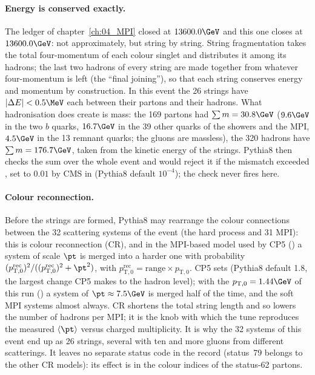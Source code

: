 \paragraph{Energy is conserved exactly.}
The ledger of chapter~\ref{ch:04_MPI} closed at $13600.0\GeV$ and this one closes at $13600.0\GeV$: not
approximately, but string by string. String fragmentation takes the total four-momentum of each colour
singlet and distributes it among its hadrons; the last two hadrons of every string are made together from
whatever four-momentum is left (the ``final joining''), so that each string conserves energy and momentum
by construction. In this event the 26 strings have $|\Delta E|<0.5\MeV$ each between their partons and
their hadrons. What hadronisation does create is mass: the 169 partons had $\sum m=30.8\GeV$ ($9.6\GeV$ in the
two $b$ quarks, $16.7\GeV$ in the 39 other quarks of the showers and the MPI, $4.5\GeV$ in the 13 remnant
quarks; the gluons are massless), the 320 hadrons have $\sum m=176.7\GeV$, taken from the
kinetic energy of the strings. Pythia8 then checks the sum over the whole event and would reject it if the
mismatch exceeded , set to $0.01$ by CMS in
 (Pythia8 default $10^{-4}$); the check never
fires here.

\paragraph{Colour reconnection.}
Before the strings are formed, Pythia8 may rearrange the colour connections between the 32 scattering systems
of the event (the hard process and 31 MPI): this is colour reconnection (CR), and in the MPI-based model used by
CP5 () a system of scale $\pt$ is merged into a harder one with probability
$(p_{\mathrm{T},0}^{\mathrm{rec}})^2/((p_{\mathrm{T},0}^{\mathrm{rec}})^2+\pt^2)$, with $p_{\mathrm{T},0}^{\mathrm{rec}}=\mathrm{range}\times p_{\mathrm{T},0}$. CP5 sets
 (Pythia8 default 1.8, the largest change CP5 makes to the hadron level);
with the $p_{\mathrm{T},0}=1.44\GeV$ of this run () a system of $\pt\approx7.5\GeV$ is merged
half of the time, and the soft MPI systems almost always. CR shortens the total string length and so lowers
the number of hadrons per MPI; it is the knob with which the tune reproduces the measured $\langle\pt\rangle$
versus charged multiplicity. It is why the 32 systems of this event end up as 26 strings, several with ten
and more gluons from different scatterings. It leaves no separate status code in the record (status~79
belongs to the other CR models): its effect is in the colour indices of the status-62 partons.

